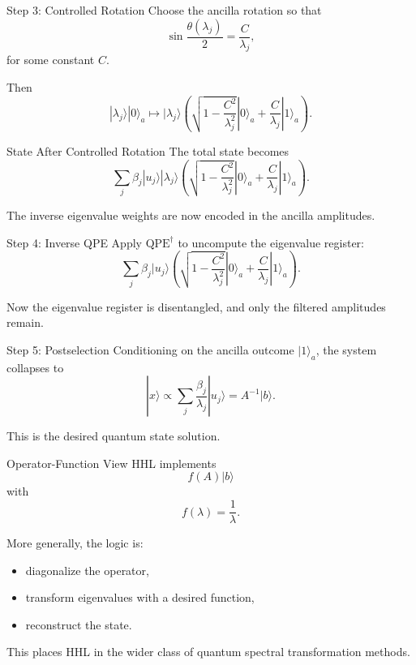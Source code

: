 \documentclass{beamer}
\begin{document}
\begin{frame}{Step 3: Controlled Rotation}
Choose the ancilla rotation so that
\[
\sin\frac{\theta(\lambda_j)}{2} = \frac{C}{\lambda_j},
\]
for some constant \(C\).

Then
\[
|\lambda_j\rangle |0\rangle_a
\mapsto
|\lambda_j\rangle
\left(
\sqrt{1-\frac{C^2}{\lambda_j^2}}|0\rangle_a
+
\frac{C}{\lambda_j}|1\rangle_a
\right).
\]
\end{frame}


\begin{frame}{State After Controlled Rotation}
The total state becomes
\[
\sum_j \beta_j |u_j\rangle |\lambda_j\rangle
\left(
\sqrt{1-\frac{C^2}{\lambda_j^2}}|0\rangle_a
+
\frac{C}{\lambda_j}|1\rangle_a
\right).
\]

The inverse eigenvalue weights are now encoded in the ancilla amplitudes.
\end{frame}


\begin{frame}{Step 4: Inverse QPE}
Apply \( \text{QPE}^{\dagger} \) to uncompute the eigenvalue register:
\[
\sum_j \beta_j |u_j\rangle
\left(
\sqrt{1-\frac{C^2}{\lambda_j^2}}|0\rangle_a
+
\frac{C}{\lambda_j}|1\rangle_a
\right).
\]

Now the eigenvalue register is disentangled, and only the filtered amplitudes remain.
\end{frame}


\begin{frame}{Step 5: Postselection}
Conditioning on the ancilla outcome \(|1\rangle_a\), the system collapses to
\[
|x\rangle \propto \sum_j \frac{\beta_j}{\lambda_j}|u_j\rangle
= A^{-1}|b\rangle.
\]

This is the desired quantum state solution.
\end{frame}


\begin{frame}{Operator-Function View}
HHL implements
\[
f(A)|b\rangle
\]
with
\[
f(\lambda)=\frac{1}{\lambda}.
\]

More generally, the logic is:
\begin{itemize}
\item diagonalize the operator,
\item transform eigenvalues with a desired function,
\item reconstruct the state.
\end{itemize}

This places HHL in the wider class of quantum spectral transformation methods.
\end{frame}
\end{document}
